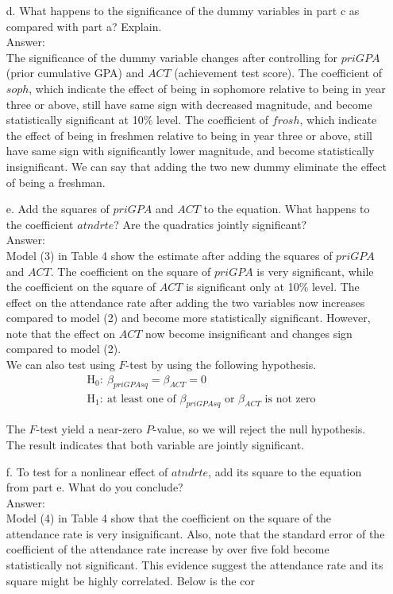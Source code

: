 \documentclass[10pt]{article}
\begin{document}
\begin{enumerate}
\item[d.] What happens to the significance of the dummy variables in part c as compared with part a? Explain.
\\ Answer:\\
The significance of the dummy variable changes after controlling for $priGPA$ (prior cumulative GPA) and $ACT$ (achievement test score). The coefficient of $soph$, which indicate the effect of being in sophomore relative to being in year three or above, still have same sign with decreased magnitude, and become statistically significant at 10\% level. The coefficient of $frosh$, which indicate the effect of being in freshmen relative to being in year three or above, still have same sign with significantly lower magnitude, and become statistically insignificant. We can say that adding the two new dummy eliminate the effect of being a freshman.

\item[e.] Add the squares of $priGPA$ and $ACT$ to the equation. What happens to the coefficient $atndrte$? Are the quadratics jointly significant?
\\ Answer:\\
Model (3) in Table 4 show the estimate after adding the squares of $priGPA$ and $ACT$. The coefficient on the square of $priGPA$ is very significant, while the coefficient on the square of $ACT$ is significant only at 10\% level. The effect on the attendance rate after adding the two variables now increases compared to model (2) and become more statistically significant. However, note that the effect on $ACT$ now become insignificant and changes sign compared to model (2).\\
We can also test using $F$-test by using the following hypothesis.
\begin{align*}
    &\text{H}_0:\ \beta_{priGPAsq}=\beta_{ACT}=0\\
    &\text{H}_1:\ \text{at least one of }\beta_{priGPAsq}\text{ or }\beta_{ACT} \text{ is not zero}
\end{align*}

The $F$-test yield a near-zero $P$-value, so we will reject the null hypothesis. The result indicates that both variable are jointly significant.

\item[f.] To test for a nonlinear effect of $atndrte$, add its square to the equation from part e. What do you conclude? 
\\ Answer:\\
Model (4) in Table 4 show that the coefficient on the square of the attendance rate is very insignificant. Also, note that the standard error of the coefficient of the attendance rate increase by over five fold become statistically not significant. This evidence suggest the attendance rate and its square might be highly correlated. Below is the cor

\end{enumerate}
\end{document}

